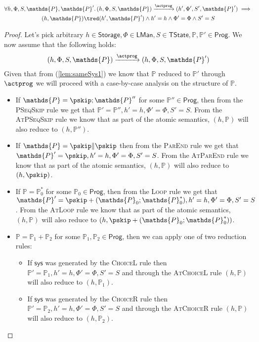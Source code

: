 \begin{lem}
	\label{lem:sameSys}
	\begin{gather*}
		\forall h, \Phi, S, \mathds{P}, \mathds{P}' \ldotp
		(h, \Phi, S, \mathds{P}) \xrightarrow{\actprog} (h', \Phi', S', \mathds{P}')
			\implies \\
		(h, \mathds{P}) \tred (h', \mathds{P}') \land h' = h \land \Phi' = \Phi \land S' = S
	\end{gather*}
	\begin{proof}
	Let's pick arbitrary $h \in \mathsf{Storage}, \Phi \in \mathsf{LMan}, S \in \mathsf{TState}, \mathds{P}, \mathds{P}' \in \mathsf{Prog}$. We now assume that the following holds:
	\begin{gather}
		\label{lem:sameSys1} (h, \Phi, S, \mathds{P}) \xrightarrow{\actprog} (h, \Phi, S, \mathds{P}')
	\end{gather}
	Given that from (\ref{lem:sameSys1}) we know that $\mathds{P}$ reduced to $\mathds{P'}$ through $\actprog$ we will proceed with a case-by-case analysis on the structure of $\mathds{P}$.
	\begin{itemize}
		\item If $\mathds{P} = \pskip ; \mathds{P}''$ for some $\mathds{P}'' \in \mathsf{Prog}$, then from the \textsc{PSeqSkip} rule we get that $\mathds{P}' = \mathds{P}'', h' = h, \Phi' = \Phi, S' = S$. From the \textsc{AtPSeqSkip} rule we know that as part of the atomic semantics, $(h, \mathds{P})$ will also reduce to $(h, \mathds{P}'')$.
		
		\item If $\mathds{P} = \pskip \| \pskip$ then from the \textsc{ParEnd} rule we get that $\mathds{P}' = \pskip, h' = h, \Phi' = \Phi, S' = S$. From the \textsc{AtParEnd} rule we know that as part of the atomic semantics, $(h, \mathds{P})$ will also reduce to $(h, \pskip)$.
		
		\item If $\mathds{P} = \mathds{P}_0^*$ for some $\mathds{P}_0 \in \mathsf{Prog}$, then from the \textsc{Loop} rule we get that $\mathds{P}' = \pskip + (\mathds{P}_0;\mathds{P}_0^*), h' = h, \Phi' = \Phi, S' = S$. From the \textsc{AtLoop} rule we know that as part of the atomic semantics, $(h, \mathds{P})$ will also reduce to $(h, \pskip + (\mathds{P}_0;\mathds{P}_0^*))$.
		
		\item $\mathds{P} = \mathds{P}_1 + \mathds{P}_2$ for some $\mathds{P}_1, \mathds{P}_2 \in \mathsf{Prog}$, then we can apply one of two reduction rules:
			\begin{itemize}
				\item If $\mathsf{sys}$ was generated by the \textsc{ChoiceL} rule then $\mathds{P}' = \mathds{P}_1, h' = h, \Phi' = \Phi, S' = S$ and through the \textsc{AtChoiceL} rule $(h, \mathds{P})$ will also reduce to $(h, \mathds{P}_1)$.
				\item If $\mathsf{sys}$ was generated by the \textsc{ChoiceR} rule then $\mathds{P}' = \mathds{P}_2, h' = h, \Phi' = \Phi, S' = S$ and through the \textsc{AtChoiceR} rule $(h, \mathds{P})$ will also reduce to $(h, \mathds{P}_2)$.
			\end{itemize}
	\end{itemize}
	\end{proof}
\end{lem}